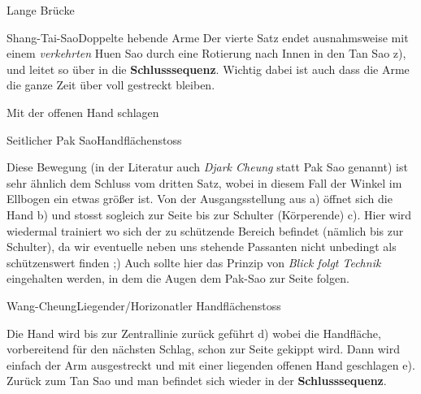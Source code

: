 \begin{WTSatz}{Lange Br\"ucke}
\begin{WTSatzTeil}{Shang-Tai-Sao}{Doppelte hebende Arme}
		Der vierte Satz endet ausnahmsweise mit einem \textit{verkehrten} Huen Sao durch eine Rotierung nach Innen in den Tan Sao z), und leitet so \"uber in die \textbf{Schlusssequenz}. Wichtig dabei ist auch dass die Arme die ganze Zeit \"uber voll gestreckt bleiben.
		
	\end{WTSatzTeil}
\end{WTSatz}


\begin{WTSatz}{Mit der offenen Hand schlagen}%

	
	\begin{WTSatzTeil}{Seitlicher Pak Sao}{Handfl\"achenstoss}

		Diese Bewegung (in der Literatur auch \textit{Djark Cheung} statt Pak Sao genannt) ist sehr \"ahnlich dem Schluss vom dritten Satz, wobei in diesem Fall der Winkel im Ellbogen ein etwas gr\"o{\ss}er ist. Von der Ausgangsstellung aus a) \"offnet sich die Hand b) und stosst sogleich zur Seite bis zur Schulter (K\"orperende) c). Hier wird wiedermal trainiert wo sich der zu sch\"utzende Bereich befindet (n\"amlich bis zur Schulter), da wir eventuelle neben uns stehende Passanten nicht unbedingt als sch\"utzenswert finden ;) Auch sollte hier das Prinzip von \textit{Blick folgt Technik} eingehalten werden, in dem die Augen dem Pak-Sao zur Seite folgen.
		
		
	\end{WTSatzTeil}
	\begin{WTSatzTeil}{Wang-Cheung}{Liegender/Horizonatler Handfl\"achenstoss}
		
		Die Hand wird bis zur Zentrallinie zur\"uck gef\"uhrt d) wobei die Handfl\"ache, vorbereitend f\"ur den n\"achsten Schlag, schon zur Seite gekippt wird. Dann wird einfach der Arm ausgestreckt und mit einer liegenden offenen Hand geschlagen e). Zur\"uck zum Tan Sao und man befindet sich wieder in der \textbf{Schlusssequenz}.
		
	\end{WTSatzTeil}
\end{WTSatz}


